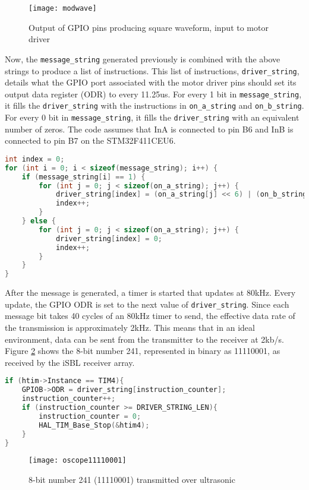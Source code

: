 \documentclass[12pt,a4paper]{report}
\begin{document}
\begin{figure}[htbp]
	\centering
	\texttt{[image: modwave]}
	\caption{Output of GPIO pins producing square waveform, input to motor driver}
	\label{fig:modwave}
\end{figure}

Now, the \verb|message_string| generated previously is combined with the above strings to produce a list of instructions. This list of instructions, \verb|driver_string|, details what the GPIO port associated with the motor driver pins should set its output data register (ODR) to every 11.25us. For every 1 bit in \verb|message_string|, it fills the \verb|driver_string| with the instructions in \verb|on_a_string| and \verb|on_b_string|. For every 0 bit in \verb|message_string|, it fills the \verb|driver_string| with an equivalent number of zeros. The code assumes that InA is connected to pin B6 and InB is connected to pin B7 on the STM32F411CEU6.

\pagebreak

\begin{lstlisting}[language=C++]
int index = 0;
for (int i = 0; i < sizeof(message_string); i++) {
	if (message_string[i] == 1) {
		for (int j = 0; j < sizeof(on_a_string); j++) {
			driver_string[index] = (on_a_string[j] << 6) | (on_b_string[j] << 7);
			index++;
		}
	} else {
		for (int j = 0; j < sizeof(on_a_string); j++) {
			driver_string[index] = 0;
			index++;
		}
	}
}
\end{lstlisting}

After the message is generated, a timer is started that updates at 80kHz. Every update, the GPIO ODR is set to the next value of \verb|driver_string|. Since each message bit takes 40 cycles of an 80kHz timer to send, the effective data rate of the transmission is approximately 2kHz. This means that in an ideal environment, data can be sent from the transmitter to the receiver at 2kb/s. Figure \ref{fig:oscope11110001} shows the 8-bit number 241, represented in binary as 11110001, as received by the iSBL receiver array.

\begin{lstlisting}[language=C++]
if (htim->Instance == TIM4){
	GPIOB->ODR = driver_string[instruction_counter]; 
	instruction_counter++;
	if (instruction_counter >= DRIVER_STRING_LEN){
		instruction_counter = 0;
		HAL_TIM_Base_Stop(&htim4);
	}
}
\end{lstlisting}

\begin{figure}[htbp]
	\centering
	\texttt{[image: oscope11110001]}
	\caption{8-bit number 241 (11110001) transmitted over ultrasonic}
	\label{fig:oscope11110001}
\end{figure}
\end{document}
